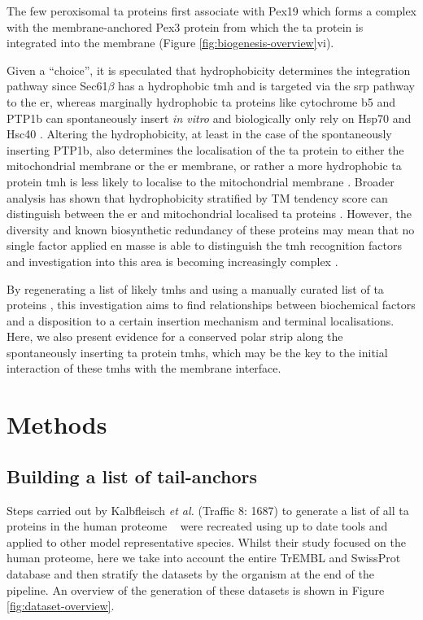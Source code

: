 The few peroxisomal \gls{ta} proteins first associate with Pex19 which forms a complex with the membrane\--anchored Pex3 protein from which the \gls{ta} protein is integrated into the membrane \cite{Chen2014, Yagita2013, Costello2017}(Figure \ref{fig:biogenesis-overview}vi).

Given a ``choice'', it is speculated that hydrophobicity determines the integration pathway since Sec61$\beta$ has a hydrophobic \gls{tmh} and is targeted via the \gls{srp} pathway to the \gls{er}, whereas marginally hydrophobic \gls{ta} proteins like cytochrome b5 and PTP1b can spontaneously insert \textit{in vitro} and biologically only rely on Hsp70 and Hsc40 \cite{Costa2018, Rabu2008, Rabu2009}.
Altering the hydrophobicity, at least in the case of the spontaneously inserting PTP1b, also determines the localisation of the \gls{ta} protein to either the mitochondrial membrane or the \gls{er} membrane, or rather a more hydrophobic \gls{ta} protein \gls{tmh} is less likely to localise to the mitochondrial membrane \cite{Fueller2015}.
Broader analysis has shown that hydrophobicity \cite{White1999} stratified by TM tendency score \cite{Zhao2006} can distinguish between the \gls{er} and mitochondrial localised \gls{ta} proteins \cite{Guna2018}.
However, the diversity and known biosynthetic redundancy of these proteins may mean that no single factor applied en masse is able to distinguish the \gls{tmh} recognition factors and investigation into this area is becoming increasingly complex \cite{Guna2018}.

By regenerating a list of likely \gls{tmh}s \cite{Kalbfleisch2007} and using a manually curated list of \gls{ta} proteins \cite{TheUniProtConsortium2014}, this investigation aims to find relationships between biochemical factors and a disposition to a certain insertion mechanism and terminal localisations.
Here, we also present evidence for a conserved polar strip along the spontaneously inserting \gls{ta} protein \gls{tmh}s, which may be the key to the initial interaction of these \gls{tmh}s with the membrane interface.

\section{Methods}

\subsection{Building a list of tail-anchors}
Steps carried out by Kalbfleisch \textit{et al.} (Traffic 8: 1687) to generate a list of all \gls{ta} proteins in the human proteome ~\cite{Kalbfleisch2007} were recreated using up to date tools and applied to other model representative species.
Whilst their study focused on the human proteome, here we take into account the entire TrEMBL and SwissProt database and then stratify the datasets by the organism at the end of the pipeline.
An overview of the generation of these datasets is shown in Figure \ref{fig:dataset-overview}.

